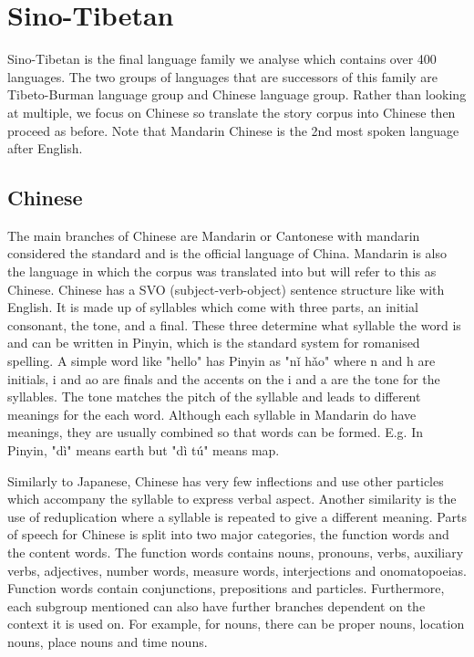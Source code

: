 \section{Sino-Tibetan}
Sino-Tibetan is the final language family we analyse which contains over 400 languages. The two groups of languages that are successors of this family are Tibeto-Burman language group and Chinese language group. Rather than looking at multiple, we focus on Chinese so translate the story corpus into Chinese then proceed as before. Note that Mandarin Chinese is the 2nd most spoken language after English.

\subsection{Chinese}
The main branches of Chinese are Mandarin or Cantonese with mandarin considered the standard and is the official language of China. Mandarin is also the language in which the corpus was translated into but will refer to this as Chinese. Chinese has a SVO (subject-verb-object) sentence structure like with English. It is made up of syllables\cite{ross2017modern} which come with three parts, an initial consonant, the tone, and a final. These three determine what syllable the word is and can be written in Pinyin, which is the standard system for romanised spelling. A simple word like "hello" has Pinyin as "nǐ hǎo" where n and h are initials, i and ao are finals and the accents on the i and a are the tone for the syllables. The tone matches the pitch of the syllable and leads to different meanings for the each word. Although each syllable in Mandarin do have meanings, they are usually combined so that words can be formed. E.g. In Pinyin, "dì" means earth but "dì tú" means map.

Similarly to Japanese, Chinese has very few inflections and use other particles which accompany the syllable to express verbal aspect. Another similarity is the use of reduplication where a syllable is repeated to give a different meaning. Parts of speech for Chinese is split into two major categories, the function words and the content words. The function words contains nouns, pronouns, verbs, auxiliary verbs, adjectives, number words, measure words, interjections and onomatopoeias. Function words contain conjunctions, prepositions and particles. Furthermore, each subgroup mentioned can also have further branches dependent on the context it is used on. For example, for nouns, there can be proper nouns, location nouns, place nouns and time nouns.

